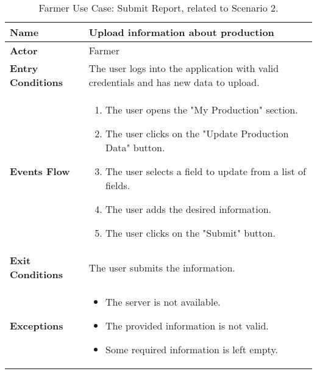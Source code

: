 \begin{table}[hbt!]
\centering
\small
\caption{\label{tab:farmerNewInfo}Farmer Use Case: Submit Report, related to Scenario 2.}
\renewcommand{\arraystretch}{1.25}
\begin{tabular}{|l|>{\raggedright\arraybackslash}m{12cm}|}

    \hline
    \textbf{Name} & Upload information about production\\
    \hline
   	\textbf{Actor} & Farmer\\
    \hline
    \textbf{Entry Conditions} & The user logs into the application with valid credentials and has new data to upload.\\
    \hline
    
    \textbf{Events Flow} & 
    		\begin{enumerate}
    			\item The user opens the "My Production" section.
    			\item The user clicks on the "Update Production Data" button.
    			\item The user selects a field to update from a list of fields.
    			\item The user adds the desired information.
    			\item The user clicks on the "Submit" button.
    		\end{enumerate}
    	\\
    \hline
    \textbf{Exit Conditions} & The user submits the information.\\
    \hline
    \textbf{Exceptions} & 
    		\begin{itemize}
    			\item The server is not available.
    			\item The provided information is not valid.
    			\item Some required information is left empty.
    		\end{itemize}
    \\
    \hline
\end{tabular}
\end{table}